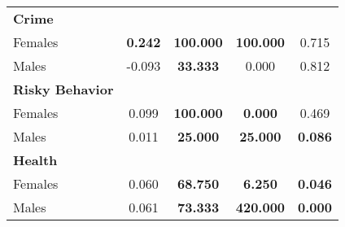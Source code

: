 \begin{tabular}{l c c c c}
\midrule
\textbf{Crime} & & & & \\
\quad Females &  \textbf{    0.242} & \textbf{  100.000} & \textbf{   100.000} & 0.715 \\
\quad Males &     -0.093 & \textbf{   33.333} &     0.000 & 0.812 \\
\midrule
\textbf{Risky Behavior} & & & & \\
\quad Females &      0.099 & \textbf{  100.000} & \textbf{   0.000} & 0.469 \\
\quad Males &      0.011 & \textbf{   25.000} & \textbf{   25.000} & \textbf{ 0.086} \\
\midrule
\textbf{Health} & & & & \\
\quad Females &      0.060 & \textbf{   68.750} & \textbf{   6.250} & \textbf{0.046} \\
\quad Males &      0.061 & \textbf{   73.333} & \textbf{   420.000} & \textbf{0.000} \\
\bottomrule
\end{tabular}
